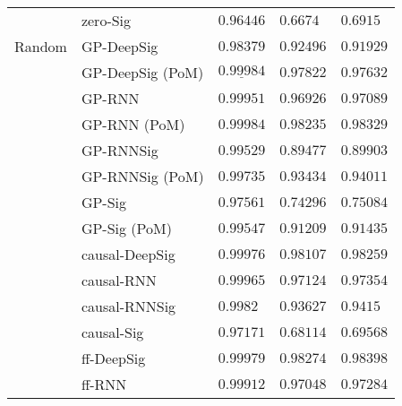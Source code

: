 \begin{tabular}{lllll}
       & zero-Sig &                           $ 0.96446 $ &                            $ 0.6674 $ &                            $ 0.6915 $ \\
Random & GP-DeepSig &                           $ 0.98379 $ &                           $ 0.92496 $ &                           $ 0.91929 $ \\
       & GP-DeepSig (PoM) &            $  \underline{ 0.99984 } $ &                           $ 0.97822 $ &                           $ 0.97632 $ \\
       & GP-RNN &                           $ 0.99951 $ &                           $ 0.96926 $ &                           $ 0.97089 $ \\
       & GP-RNN (PoM) &                           $ 0.99984 $ &                           $ 0.98235 $ &                           $ 0.98329 $ \\
       & GP-RNNSig &                           $ 0.99529 $ &                           $ 0.89477 $ &                           $ 0.89903 $ \\
       & GP-RNNSig (PoM) &                           $ 0.99735 $ &                           $ 0.93434 $ &                           $ 0.94011 $ \\
       & GP-Sig &                           $ 0.97561 $ &                           $ 0.74296 $ &                           $ 0.75084 $ \\
       & GP-Sig (PoM) &                           $ 0.99547 $ &                           $ 0.91209 $ &                           $ 0.91435 $ \\
       & causal-DeepSig &                           $ 0.99976 $ &                           $ 0.98107 $ &                           $ 0.98259 $ \\
       & causal-RNN &                           $ 0.99965 $ &                           $ 0.97124 $ &                           $ 0.97354 $ \\
       & causal-RNNSig &                            $ 0.9982 $ &                           $ 0.93627 $ &                            $ 0.9415 $ \\
       & causal-Sig &                           $ 0.97171 $ &                           $ 0.68114 $ &                           $ 0.69568 $ \\
       & ff-DeepSig &                           $ 0.99979 $ &                           $ 0.98274 $ &                           $ 0.98398 $ \\
       & ff-RNN &                           $ 0.99912 $ &                           $ 0.97048 $ &                           $ 0.97284 $ \\

\end{tabular}
